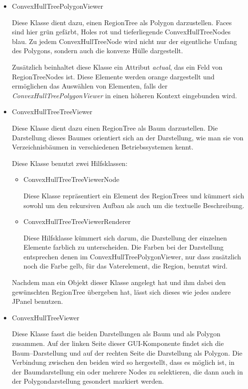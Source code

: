 \begin{itemize}
\item ConvexHullTreePolygonViewer

Diese Klasse dient dazu, einen RegionTree als Polygon darzustellen. Faces sind hier grün gefärbt, Holes rot und tieferliegende ConvexHullTreeNodes blau. Zu jedem ConvexHullTreeNode wird nicht nur der eigentliche Umfang des Polygons, sondern auch die konvexe Hülle dargestellt.

Zusätzlich beinhaltet diese Klasse ein Attribut \textit{actual}, das ein Feld von RegionTreeNodes ist. Diese Elemente werden orange dargestellt und ermöglichen das Auswählen von Elementen, falls der \textit{ConvexHullTreePolygonViewer} in einen höheren Kontext eingebunden wird.

\item ConvexHullTreeTreeViewer

Diese Klasse dient dazu einen RegionTree als Baum darzustellen. Die Darstellung dieses Baumes orientiert sich an der Darstellung, wie man sie von Verzeichnisbäumen in verschiedenen Betriebssystemen kennt.

Diese Klasse benutzt zwei Hilfsklassen:
\begin{itemize}
\item ConvexHullTreeTreeViewerNode

Diese Klasse repräsentiert ein Element des RegionTrees und kümmert sich sowohl um den rekursiven Aufbau als auch um die textuelle Beschreibung.
\item ConvexHullTreeTreeViewerRenderer

Diese Hilfsklasse kümmert sich darum, die Darstellung der einzelnen Elemente farblich zu unterscheiden. Die Farben bei der Darstellung entsprechen denen im ConvexHullTreePolygonViewer, nur dass zusätzlich noch die Farbe gelb, für das Vaterelement, die Region, benutzt wird.
\end{itemize}

Nachdem man ein Objekt dieser Klasse angelegt hat und ihm dabei den gewünschten RegionTree übergeben hat, lässt sich dieses wie jedes andere JPanel benutzen.

\item ConvexHullTreeViewer

Diese Klasse fasst die beiden Darstellungen als Baum und als Polygon zusammen. Auf der linken Seite dieser GUI-Komponente findet sich die Baum--Darstellung und auf der rechten Seite die Darstellung als Polygon. Die Verbindung zwischen den beiden wird so hergestellt, dass es möglich ist, in der Baumdarstellung ein oder mehrere Nodes zu selektieren, die dann auch in der Polygondarstellung gesondert markiert werden.


\end{itemize}
